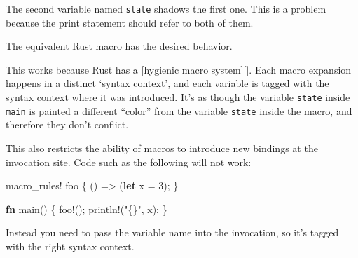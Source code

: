 \documentclass[a4paper,]{book}
\newenvironment{Shaded}{\begin{snugshade}}{\end{snugshade}}
\newcommand{\KeywordTok}[1]{\textcolor[rgb]{0.13,0.29,0.53}{\textbf{{#1}}}}
\newcommand{\DecValTok}[1]{\textcolor[rgb]{0.00,0.00,0.81}{{#1}}}
\newcommand{\StringTok}[1]{\textcolor[rgb]{0.31,0.60,0.02}{{#1}}}
\newcommand{\OtherTok}[1]{\textcolor[rgb]{0.56,0.35,0.01}{{#1}}}
\newcommand{\NormalTok}[1]{{#1}}
\begin{document}
The second variable named \texttt{state} shadows the first one. This is
a problem because the print statement should refer to both of them.

The equivalent Rust macro has the desired behavior.

\begin{Shaded}
\end{Shaded}

This works because Rust has a {[}hygienic macro system{]}{[}{]}. Each
macro expansion happens in a distinct `syntax context', and each
variable is tagged with the syntax context where it was introduced. It's
as though the variable \texttt{state} inside \texttt{main} is painted a
different ``color'' from the variable \texttt{state} inside the macro,
and therefore they don't conflict.

This also restricts the ability of macros to introduce new bindings at
the invocation site. Code such as the following will not work:

\begin{Shaded}
\begin{Highlighting}[]
\OtherTok{macro_rules!} \NormalTok{foo \{}
    \NormalTok{() => (}\KeywordTok{let} \NormalTok{x = }\DecValTok{3}\NormalTok{);}
\NormalTok{\}}

\KeywordTok{fn} \NormalTok{main() \{}
    \OtherTok{foo!}\NormalTok{();}
    \OtherTok{println!}\NormalTok{(}\StringTok{"\{\}"}\NormalTok{, x);}
\NormalTok{\}}
\end{Highlighting}
\end{Shaded}

Instead you need to pass the variable name into the invocation, so it's
tagged with the right syntax context.

\begin{Shaded}
\end{Shaded}
\end{document}
